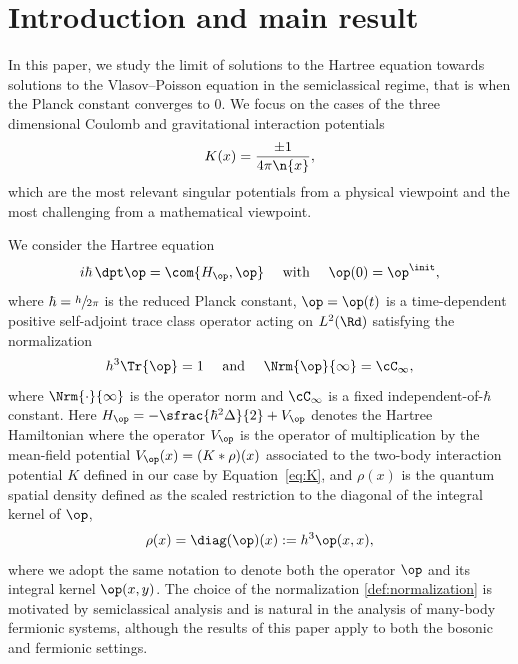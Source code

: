 
\vspace*{-4\baselineskip}\mbox{}
\section{Introduction and main result}

In this paper, we study the limit of solutions to the Hartree equation towards solutions to the Vlasov--Poisson equation in the semiclassical regime, that is when the Planck constant converges to $0$. We focus on the cases of the three dimensional Coulomb and gravitational interaction potentials
\begin{equation}\label{eq:K}
K(x) = \frac{\pm 1}{4\pi\n{x}},
\end{equation}
which are the most relevant singular potentials from a physical viewpoint and the most challenging from a mathematical viewpoint.

We consider the Hartree equation
\begin{equation}\label{eq:Hartree}
i\hbar\,\dpt \op = \com{H_{\op},\op} \quad \text{ with } \quad \op(0)= \op^{\init},
\end{equation}
where $\hbar=\sfrac{h}{2\pi}$ is the reduced Planck constant, $\op = \op(t)$ is a time-dependent positive self-adjoint trace class operator acting on $L^2(\Rd)$ satisfying the normalization
\begin{equation}\label{def:normalization}
h^3\Tr{\op}=1\quad \text{ and } \quad \Nrm{\op}{\infty}=\cC_\infty,
\end{equation}
where $\Nrm{\cdot}{\infty}$ is the operator norm and $\cC_\infty$ is a fixed independent-of-$\hbar$ constant.
Here $H_{\op} = -\sfrac{\hbar^2\Delta}{2} + V_{\op}$ denotes the Hartree Hamiltonian where the operator $V_{\op}$ is the operator of multiplication by the mean-field potential $V_{\op}(x) = (K*\rho)(x)$ associated to the two-body interaction potential $K$ defined in our case by Equation~\eqref{eq:K}, and $\rho(x)$ is the quantum spatial density defined as the scaled restriction to the diagonal of the integral kernel of $\op$,
\begin{equation*}
\rho(x)=\diag(\op)(x) := h^3\op(x,x),
\end{equation*}
where we adopt the same notation to denote both the operator $\op$ and its integral kernel $\op(x,y)$. The choice of the normalization \eqref{def:normalization} is motivated by semiclassical analysis and is natural in the analysis of many-body fermionic systems, although the results of this paper apply to both the bosonic and fermionic settings.

